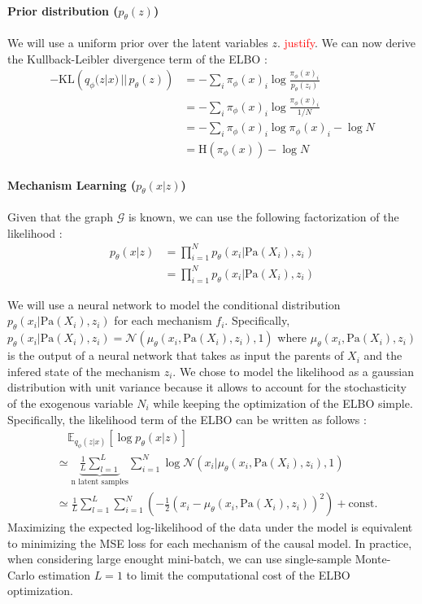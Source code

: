 \documentclass{article}
\newcommand\todo[1]{\textcolor{red}{#1}}
\begin{document}
\paragraph{Prior distribution ($p_\theta(z)$)} We will use a uniform prior over the latent variables $z$. \todo{justify}. We can now derive the Kullback-Leibler divergence term of the ELBO :
\begin{align*}
    -\text{KL}\left(q_\phi(z | x) \,||\, p_\theta(z)\right)
    &= - \sum_{i} \pi_\phi(x)_i \log \frac{\pi_\phi(x)_i}{p_\theta(z_i)} \\
    &= - \sum_{i} \pi_\phi(x)_i \log \frac{\pi_\phi(x)_i}{1/N} \\
    &= - \sum_{i} \pi_\phi(x)_i \log \pi_\phi(x)_i - \log N \\
    &= \text{H}(\pi_\phi(x)) - \log N
\end{align*}
\paragraph{Mechanism Learning ($p_\theta(x | z)$)}

Given that the graph $\mathcal{G}$ is known, we can use the following factorization of the likelihood :
\begin{align*}
    p_\theta(x | z) &= \prod_{i = 1}^N p_\theta(x_i | \text{Pa}(X_i), z_i) \\
    &= \prod_{i = 1}^N p_\theta(x_i | \text{Pa}(X_i), z_i)
\end{align*}

We will use a neural network to model the conditional distribution $p_\theta(x_i | \text{Pa}(X_i), z_i)$ for each mechanism $f_i$. Specifically, $p_\theta(x_i | \text{Pa}(X_i), z_i) = \mathcal{N}(\mu_\theta(x_i, \text{Pa}(X_i), z_i), 1)$ where $\mu_\theta(x_i, \text{Pa}(X_i), z_i)$ is the output of a neural network that takes as input the parents of $X_i$ and the infered state of the mechanism $z_i$. We chose to model the likelihood as a gaussian distribution with unit variance because it allows to account for the stochasticity of the exogenous variable $N_i$ while keeping the optimization of the ELBO simple. Specifically, the likelihood term of the ELBO can be written as follows :
\begin{align*}
    & \quad \mathbb{E}_{q_\phi(z | x)} \left[ \log p_\theta(x | z) \right] \\ &\simeq \underbrace{\frac{1}{L} \sum_{l = 1}^L }_{\text{n latent samples}} \sum_{i = 1}^N \log \mathcal{N}(x_i | \mu_\theta(x_i, \text{Pa}(X_i), z_i), 1)\\
    &\simeq \frac{1}{L} \sum_{l = 1}^L \sum_{i = 1}^N \left( -\frac{1}{2} \left( x_i - \mu_\theta(x_i, \text{Pa}(X_i), z_i) \right)^2 \right) + \text{const.}
\end{align*}
Maximizing the expected log-likelihood of the data under the model is equivalent to minimizing the MSE loss for each mechanism of the causal model. In practice, when considering large enought mini-batch, we can use single-sample Monte-Carlo estimation $L=1$ to limit the computational cost of the ELBO optimization.
\end{document}
